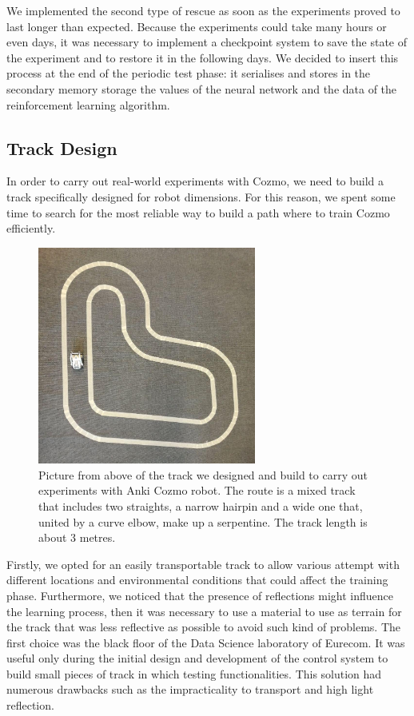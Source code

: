 We implemented the second type of rescue as soon as the experiments proved to last longer than expected.
Because the experiments could take many hours or even days, it was necessary to implement a checkpoint system to save the state of the experiment and to restore it in the following days.
We decided to insert this process at the end of the periodic test phase: it serialises and stores in the secondary memory storage the values of the neural network and the data of the reinforcement learning algorithm.

\subsection{Track Design}

In order to carry out real-world experiments with Cozmo, we need to build a track specifically designed for robot dimensions.
For this reason, we spent some time to search for the most reliable way to build a path where to train Cozmo efficiently.

\begin{figure}
    \centering
    \includegraphics[width=0.64\textwidth]{img/track.png}
    \caption[CozmoDriver Racing Track]{ Picture from above of the track we designed and build to carry out experiments with Anki Cozmo robot.
        The route is a mixed track that includes two straights, a narrow hairpin and a wide one that, united by a curve elbow, make up a serpentine.
        The track length is about 3 metres.}
    \label{fig:track_cozmo}
\end{figure}


Firstly, we opted for an easily transportable track to allow various attempt with different locations and environmental conditions that could affect the training phase.
Furthermore, we noticed that the presence of reflections might influence the learning process, then it was necessary to use a material to use as terrain for the track that was less reflective as possible to avoid such kind of problems.
The first choice was the black floor of the Data Science laboratory of Eurecom.
It was useful only during the initial design and development of the control system to build small pieces of track in which testing functionalities.
This solution had numerous drawbacks such as the impracticality to transport and high light reflection.

